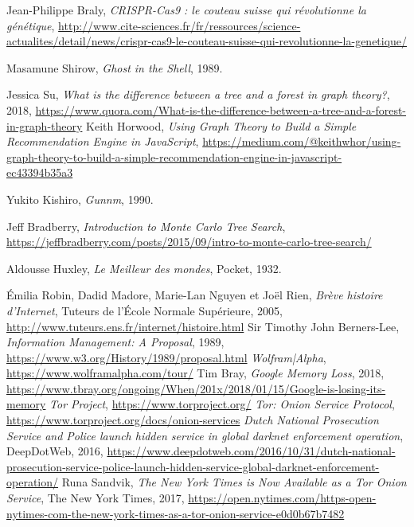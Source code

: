 \begin{thebibliography}{99}
     Jean-Philippe Braly, \emph{CRISPR-Cas9 : le couteau suisse qui révolutionne la génétique}, \url{http://www.cite-sciences.fr/fr/ressources/science-actualites/detail/news/crispr-cas9-le-couteau-suisse-qui-revolutionne-la-genetique/}

     Masamune Shirow, \emph{Ghost in the Shell}, 1989.

     Jessica Su, \emph{What is the difference between a tree and a forest in graph theory?}, 2018, \url{https://www.quora.com/What-is-the-difference-between-a-tree-and-a-forest-in-graph-theory}
     Keith Horwood, \emph{Using Graph Theory to Build a Simple Recommendation Engine in JavaScript}, \url{https://medium.com/@keithwhor/using-graph-theory-to-build-a-simple-recommendation-engine-in-javascript-ec43394b35a3}

     Yukito Kishiro, \emph{Gunnm}, 1990.

     Jeff Bradberry, \emph{Introduction to Monte Carlo Tree Search}, \url{https://jeffbradberry.com/posts/2015/09/intro-to-monte-carlo-tree-search/}

     Aldousse Huxley, \emph{Le Meilleur des mondes}, Pocket, 1932.

     Émilia Robin, Dadid Madore, Marie-Lan Nguyen et Joël Rien, \emph{Brève histoire d'Internet}, Tuteurs de l'École Normale Supérieure, 2005, \url{http://www.tuteurs.ens.fr/internet/histoire.html}
     Sir Timothy John Berners-Lee, \emph{Information Management: A Proposal}, 1989, \url{https://www.w3.org/History/1989/proposal.html}
     \emph{Wolfram|Alpha}, \url{https://www.wolframalpha.com/tour/}
     Tim Bray, \emph{Google Memory Loss}, 2018, \url{https://www.tbray.org/ongoing/When/201x/2018/01/15/Google-is-losing-its-memory}
     \emph{Tor Project}, \url{https://www.torproject.org/}
     \emph{Tor: Onion Service Protocol}, \url{https://www.torproject.org/docs/onion-services}
     \emph{Dutch National Prosecution Service and Police launch hidden service in global darknet enforcement operation}, DeepDotWeb, 2016, \url{https://www.deepdotweb.com/2016/10/31/dutch-national-prosecution-service-police-launch-hidden-service-global-darknet-enforcement-operation/}
     Runa Sandvik, \emph{The New York Times is Now Available as a Tor Onion Service}, The New York Times, 2017, \url{https://open.nytimes.com/https-open-nytimes-com-the-new-york-times-as-a-tor-onion-service-e0d0b67b7482}
    

\end{thebibliography}
